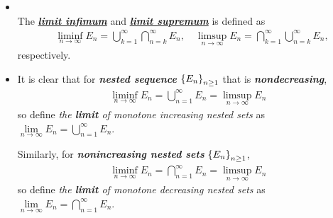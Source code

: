 \documentclass[11pt]{article}
\begin{document}
\begin{itemize}
\item \begin{definition} \citep{resnick2013probability} \\
The \underline{\emph{\textbf{limit infimum}}} and \underline{\emph{\textbf{limit supremum}}} is defined as  
\begin{align}
&\liminf\limits_{n\rightarrow \infty}E_{n} = \bigcup_{k=1}^{\infty}\bigcap_{n= k}^{\infty}E_{n}, \quad \limsup\limits_{n\rightarrow \infty}E_{n} = \bigcap_{k=1}^{\infty}\bigcup_{n= k}^{\infty}E_{n}, \label{eqn: liminf_limsup}
\end{align}
respectively.
\end{definition}

\item  \begin{remark}
It is clear that for \emph{\textbf{nested sequence}} $\left\{E_{n}\right\}_{n\ge 1}$ that is \emph{\textbf{nondecreasing}}, 
\begin{align*}
\liminf\limits_{n\rightarrow \infty}E_{n} = \bigcup_{n=1}^{\infty}E_{n} = \limsup\limits_{n\rightarrow \infty}E_{n}
\end{align*}
so define \emph{the \textbf{limit} of monotone increasing nested sets} as $\lim\limits_{n\rightarrow \infty}E_{n} = \bigcup_{n=1}^{\infty}E_{n} $.

Similarly, for \emph{\textbf{nonincreasing nested sets}} $\left\{E_{n}\right\}_{n\ge 1}$, 
\begin{align*}
\liminf\limits_{n\rightarrow \infty}E_{n} = \bigcap_{n=1}^{\infty}E_{n} = \limsup\limits_{n\rightarrow \infty}E_{n}
\end{align*}
so define \emph{the \textbf{limit} of monotone decreasing nested sets} as $\lim\limits_{n\rightarrow \infty}E_{n} = \bigcap_{n=1}^{\infty}E_{n} $.
\end{remark}


\end{itemize}
\end{document}
